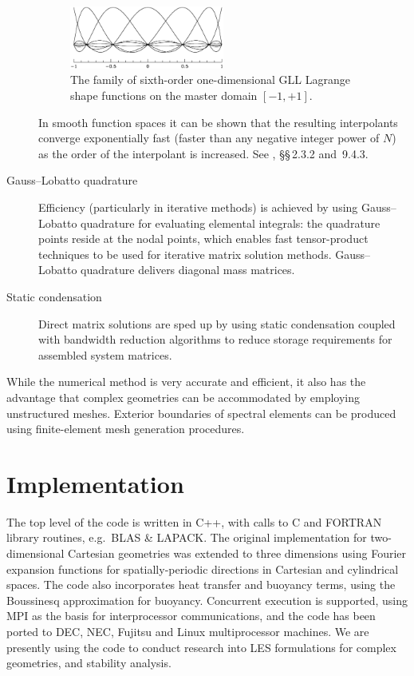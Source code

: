 \documentclass[11pt,a4paper]{report}
\begin{document}
\begin{description}
\begin{figure}
\begin{center}
  \includegraphics[width=0.5\textwidth]{shape7x7.eps}
\end{center}
\caption{The family of sixth-order one-dimensional GLL Lagrange shape
  functions on the master domain $[-1,+1]$.}
\label{fig:shapes}
\end{figure}
In smooth function spaces it can be shown that the resulting
interpolants converge exponentially fast (faster than any negative
integer power of $N$) as the order of the interpolant is increased.
See \citet{chqz88}, \S\S\,2.3.2 and~9.4.3.
\item[Gauss--Lobatto quadrature]
Efficiency (particularly in iterative methods) is achieved by
using Gauss--Lobatto quadrature for evaluating elemental integrals: the
quadrature points reside at the nodal points, which enables fast
tensor-product techniques to be used for iterative matrix solution
methods.  Gauss--Lobatto quadrature delivers diagonal mass matrices.
\item[Static condensation]
Direct matrix solutions are sped up by using static condensation
coupled with bandwidth reduction algorithms to reduce storage
requirements for assembled system matrices.
\end{description}

While the numerical method is very accurate and efficient, it also has
the advantage that complex geometries can be accommodated by employing
unstructured meshes.  Exterior boundaries of spectral elements can be
produced using finite-element mesh generation procedures.

\section{Implementation}

The top level of the code is written in C++, with calls to C and
FORTRAN library routines, e.g.\ BLAS \& LAPACK. The original
implementation for two-dimensional Cartesian geometries was extended
to three dimensions using Fourier expansion functions for
spatially-periodic directions in Cartesian and cylindrical spaces. The
code also incorporates heat transfer and buoyancy terms, using the
Boussinesq approximation for buoyancy. Concurrent execution is
supported, using MPI as the basis for interprocessor communications,
and the code has been ported to DEC, NEC, Fujitsu and Linux
multiprocessor machines.  We are presently using the code to conduct
research into LES formulations for complex geometries, and stability
analysis.
\end{document}
